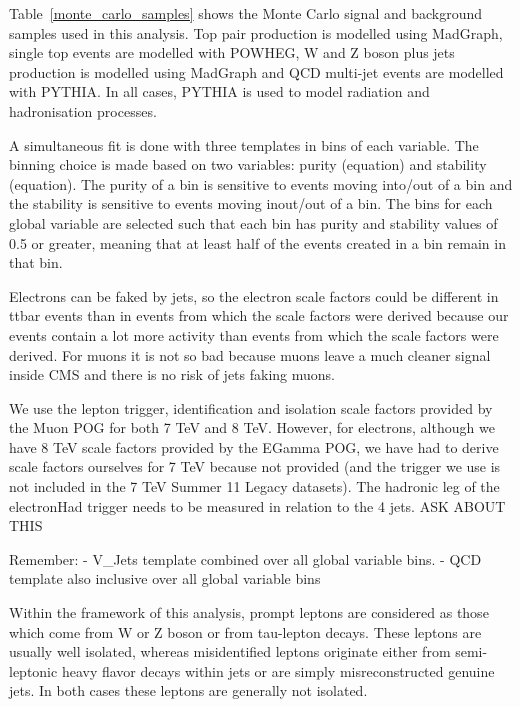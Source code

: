 Table~\ref{monte_carlo_samples} shows the Monte Carlo signal and background samples used in this analysis. Top
pair production is modelled using MadGraph, single top events are modelled with POWHEG, W and Z boson plus
jets production is modelled using MadGraph and QCD multi-jet events are modelled with PYTHIA. In all cases,
PYTHIA is used to model radiation and hadronisation processes.





A simultaneous fit is done with three templates in bins of each variable.
The binning choice is made based on two variables: purity (equation) and stability (equation). The purity of a
bin is sensitive to events moving into/out of a bin and the stability is sensitive to events moving inout/out
of a bin. The bins for each global variable are selected such that each bin has purity and stability values of
0.5 or greater, meaning that at least half of the events created in a bin remain in that bin.
	
Electrons can be faked by jets, so the electron scale factors could be different in ttbar events than in
events from which the scale factors were derived because our events contain a lot more activity than events
from which the scale factors were derived.
For muons it is not so bad because muons leave a much cleaner signal inside CMS and there is no risk of jets
faking muons.
	
We use the lepton trigger, identification and isolation scale factors provided by the Muon POG for both 7 TeV
and 8 TeV. However, for electrons, although we have 8 TeV scale factors provided by the EGamma POG, we have
had to derive scale factors ourselves for 7 TeV because not provided (and the trigger we use is not included
in the 7 TeV Summer 11 Legacy datasets).
The hadronic leg of the electronHad trigger needs to be measured in relation to the 4 jets. ASK ABOUT THIS
	 
Remember:
- V\_Jets template combined over all global variable bins.
- QCD template also inclusive over all global variable bins
	
Within the framework of this analysis, prompt leptons are considered as those which come
from W or Z boson or from tau-lepton decays. These leptons are usually well isolated, whereas
misidentified leptons originate either from semi-leptonic heavy flavor decays within jets or are
simply misreconstructed genuine jets. In both cases these leptons are generally not isolated.

